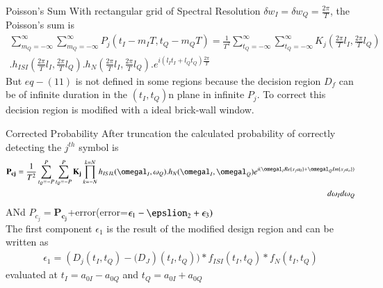 \documentclass{beamer}
\renewcommand{\vec}[1]{\mathbf{#1}}
\begin{document}
\begin{frame}{}
    \begin{block}{Poisson's Sum}
      With rectangular grid of Spectral Resolution $\delta w_I=\delta w_Q = \frac{2\pi}{T}$, the Poisson's sum is
      \begin{align}
          \sum_{m_Q=-\infty}^{\infty}\sum_{m_Q=-\infty}^{\infty}P_j(t_I-m_IT,t_Q-m_QT)=\frac{1}{T^2}\sum_{t_Q=-\infty}^{\infty}\sum_{t_Q=-\infty}^{\infty}K_j(\frac{2\pi}{T}l_I,\frac{2\pi}{T}l_Q)\\.h_{ISI}(\frac{2\pi}{T}l_I,\frac{2\pi}{T}l_Q).h_N(\frac{2\pi}{T}l_I,\frac{2\pi}{T}l_Q).e^{i(l_It_I+l_Qt_Q)\frac{2\pi}{T}}
      \end{align}
      But $eq-(11)$ is not defined in some regions because the decision region $D_f$ can be of infinite duration in the $(t_I,t_Q)$n plane in infinite $P_j$. To correct this decision region is modified with a ideal brick-wall window.
    \end{block}
\end{frame}
\begin{frame}{}
    \begin{block}{Corrected Probability}
    After truncation the calculated probability of correctly detecting the $j^{th}$ symbol is  \begin{align}
        \vec{P_{cj}}=\frac{1}{T^2}\sum_{t_Q=-P}^{P}\sum_{t_Q=-P}^{P}\vec{K_j}\prod_{k=-N}^{k=N}h_{ISIk}(\omegal_I,\omega_Q).h_N(\omegal_I,\omegal_Q)e^{i(\omegal_IRe\{s_ja_0\}+\omegal_QIm\{s_ja_o\})}\\d\omega_Id\omega_Q 
    \end{align}
    ANd $P_c_j=\vec{P_c_j}$+error(error=$\epsilon_1-\epslion_2+\epsilon_3)$\\
    The first component $\epsilon_1$ is the result of the modified design region and can be written as 
    \begin{align}
        \epsilon_1=(D_j(t_I,t_Q)-\vec(D_J)(t_I,t_Q))*f_{ISI}(t_I,t_Q)*f_N(t_I,t_Q)
    \end{align}
evaluated at $t_I=a_{0I}-a_{0Q}$ and $t_Q=a_{0I}+a_{0Q}$ 
\end{block}
\end{frame}
\end{document}
